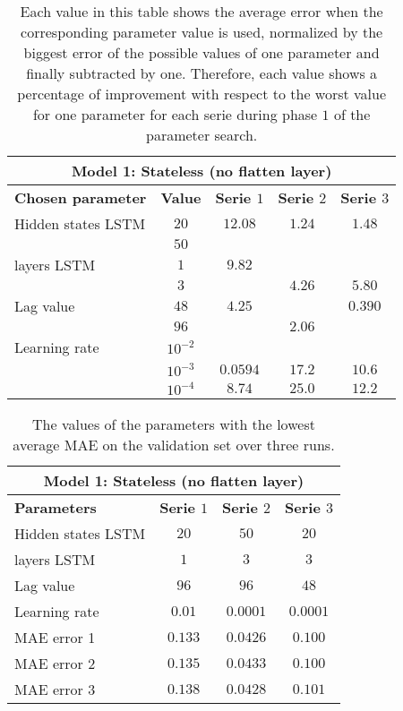 \begin{table}[ht]
	\centering
	\begin{tabular}{@{}l||c|ccc@{}} \toprule
		\multicolumn{5}{c}{Model 1: Stateless (no flatten layer)}\\\midrule\midrule
		\textbf{Chosen parameter}	& \textbf{Value} & \textbf{Serie $ 1 $} & \textbf{Serie $ 2 $} & \textbf{Serie $ 3 $}\\\midrule
		Hidden states LSTM & $ 20 $ & $12.08 $		&$ 1.24 $  & $1.48 $\\
		 		   & $ 50 $ & 		  		&		   & 		\\\hline
		layers LSTM & $ 1 $ & $9.82 $		&		   & 		\\
				    & $ 3 $ & 	      		&$ 4.26 $  & $5.80$\\\hline
		Lag value & $ 48 $ & $4.25 $ 		&		   & $0.390$\\
				  & $ 96 $ &          		&$ 2.06 $  & 		\\\hline
		Learning rate & $ 10^{-2} $ &       &		   & 		\\
					& $  10^{-3} $ &$0.0594 $&$ 17.2$  & $10.6$\\
					& $  10^{-4} $ &$8.74 $&$ 25.0$    & $12.2$\\\bottomrule
			
	\end{tabular}
	\caption{Each value in this table shows the average error when the corresponding parameter value is used, normalized by the biggest error of the possible values of one parameter and finally subtracted by one. Therefore, each value shows a percentage of improvement with respect to the worst value for one parameter for each serie during phase $ 1 $ of the parameter search.}
	\label{tab:relative_performance_parameters_phase_one_model_one}
\end{table}


\begin{table}[ht]
	\centering
	\begin{tabular}{@{}l|ccc@{}} \toprule
		\multicolumn{4}{c}{Model 1: Stateless (no flatten layer)}\\\midrule\midrule
		\textbf{Parameters}	& \textbf{Serie $ 1 $} & \textbf{Serie $ 2 $} & \textbf{Serie $ 3 $}\\\midrule
		Hidden states LSTM & $20 $&$ 50 $  & $20 $\\
		layers LSTM & $1 $&$ 3 $  & $3$\\
		Lag value & $96 $&$ 96$  & $48$\\
		Learning rate & $0.01 $&$ 0.0001$  & $0.0001$\\\hline
		MAE error 1   & $ 0.133 $ & $ 0.0426 $ & $ 0.100 $\\
		MAE error 2   & $ 0.135 $ & $ 0.0433 $ & $ 0.100 $\\
		MAE error 3   & $ 0.138 $ & $ 0.0428 $ & $ 0.101 $\\\bottomrule
	\end{tabular}
	\caption{The values of the parameters with the lowest average MAE on the validation set over three runs.}
	\label{tab:best_performing_para_phase1}
\end{table}
\newpage

